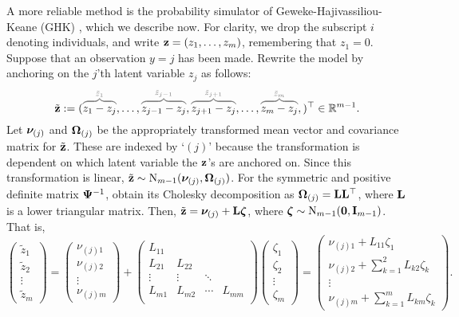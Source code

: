 A more reliable method is the probability simulator of Geweke-Hajivassiliou-Keane (GHK)  \citep{geweke1991efficient,hajivassiliou1996simulation,keane1994computationally}, which we describe now.
For clarity, we drop the subscript $i$ denoting individuals, and write ${\mathbf z} = (z_1,\dots,z_m)$, remembering that $z_1=0$.
Suppose that an observation $y=j$ has been made.
Rewrite the model by anchoring on the $j$'th latent variable $z_{j}$ as follows:
\[
  \tilde\bz := (
  \greyoverbrace{z_1 - z_j}{\tilde z_1},
  \dots,
  \greyoverbrace{z_{j-1} - z_j}{\tilde z_{j-1}},
  \greyoverbrace{z_{j+1} - z_j}{\tilde z_{j+1}},
  \dots, 
  \greyoverbrace{z_m - z_j}{\tilde z_m},
  )^\top \in \bbR^{m-1}.
\]
Let ${\bm\nu}_{(j)}$ and ${\bm\Omega}_{(j)}$ be the appropriately transformed mean vector and covariance matrix for $\tilde {{\mathbf z}}$.
These are indexed by `$(j)$' because the transformation is dependent on which latent variable the ${\mathbf z}$'s are anchored on.
Since this transformation is linear, $\tilde{{\mathbf z}} \sim \operatorname{N}_{m-1}({\bm\nu}_{(j)},{\bm\Omega}_{(j)})$.
For the symmetric and positive definite matrix ${\bm\Psi}^{-1}$, obtain its Cholesky decomposition as ${\bm\Omega}_{(j)} = {\mathbf L}{\mathbf L}^\top$, where ${\mathbf L}$ is a lower triangular matrix.
Then, $\tilde{{\mathbf z}} = {\bm\nu}_{(j)} + {\mathbf L}{\bm\zeta}$, where ${\bm\zeta} \sim\operatorname{N}_{m-1}({\mathbf 0},{\mathbf I}_{m-1})$.
That is,
\begin{equation*}
  \begin{pmatrix}
    \tilde z_1 \\
    \tilde z_2 \\
    \vdots \\
    \tilde z_m
  \end{pmatrix}  
  =
  \begin{pmatrix}
    \nu_{(j)1} \\
    \nu_{(j)2} \\    
    \vdots \\
    \nu_{(j)m}
  \end{pmatrix}  
  +
  \begin{pmatrix}
    L_{11} &       &       & \\
    L_{21} &L_{22} &       & \\
    \vdots &\vdots &\ddots & \\
    L_{m1} &L_{m2} &\cdots &L_{mm} \\
  \end{pmatrix} 
  \begin{pmatrix}
    \zeta_1 \\
    \zeta_2 \\    
    \vdots \\
    \zeta_m
  \end{pmatrix}
  =
  \begin{pmatrix}
    \nu_{(j)1} + L_{11}\zeta_1 \\
    \nu_{(j)2} + \sum_{k=1}^2 L_{k2} \zeta_k \\    
    \vdots \\
    \nu_{(j)m} + \sum_{k=1}^m L_{km} \zeta_k
  \end{pmatrix}.  
\end{equation*}


